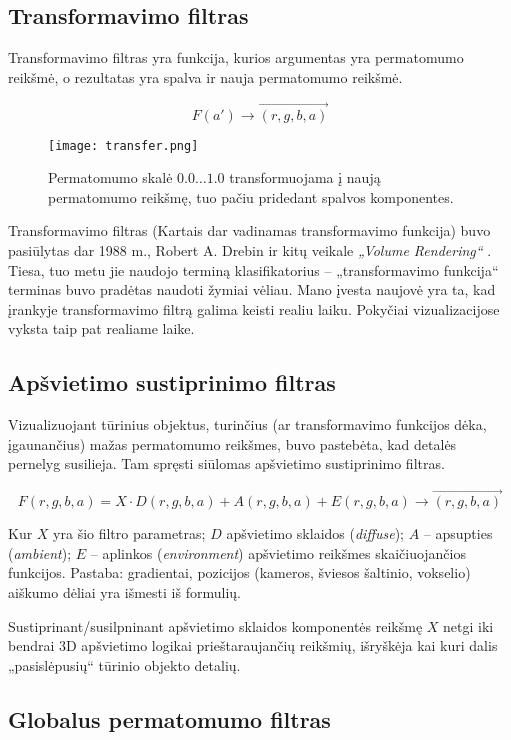 \subsection{Transformavimo filtras}

Transformavimo filtras yra funkcija, kurios argumentas yra permatomumo
reikšmė, o rezultatas yra spalva ir nauja permatomumo reikšmė.

$$
F(a') \to \vec{(r, g, b, a)}
$$

\begin{figure}[!ht]
\centering
\texttt{[image: transfer.png]}
\caption{Permatomumo skalė $0.0 \ldots 1.0$ transformuojama į naują
permatomumo reikšmę, tuo pačiu pridedant spalvos komponentes.}
\label{fig:transfer}
\end{figure}

Transformavimo filtras (Kartais dar vadinamas transformavimo funkcija) buvo
pasiūlytas dar 1988 m., Robert A. Drebin ir kitų veikale \emph{„Volume
Rendering“} \cite{transfer}. Tiesa, tuo metu jie naudojo terminą
klasifikatorius -- „transformavimo funkcija“ terminas buvo pradėtas naudoti
žymiai vėliau. Mano įvesta naujovė yra ta, kad įrankyje transformavimo filtrą
galima keisti realiu laiku. Pokyčiai vizualizacijose vyksta taip pat
realiame laike.

\subsection{Apšvietimo sustiprinimo filtras}

Vizualizuojant tūrinius objektus, turinčius (ar transformavimo funkcijos dėka,
įgaunančius) mažas permatomumo reikšmes, buvo pastebėta, kad detalės pernelyg
susilieja. Tam spręsti siūlomas apšvietimo sustiprinimo filtras.

$$
F(r, g, b, a) = X \cdot D(r, g, b, a) + A(r, g, b, a) + E(r, g, b, a) \to \vec{(r, g, b, a)}
$$

Kur $X$ yra šio filtro parametras; $D$ apšvietimo sklaidos (\emph{diffuse});
$A$ -- apsupties (\emph{ambient}); $E$ -- aplinkos (\emph{environment})
apšvietimo reikšmes skaičiuojančios funkcijos. Pastaba: gradientai, pozicijos
(kameros, šviesos šaltinio, vokselio) aiškumo dėliai yra išmesti iš formulių.

Sustiprinant/susilpninant apšvietimo sklaidos komponentės reikšmę $X$ netgi
iki bendrai 3D apšvietimo logikai prieštaraujančių reikšmių, išryškėja kai
kuri dalis „pasislėpusių“ tūrinio objekto detalių.

\subsection{Globalus permatomumo filtras}

